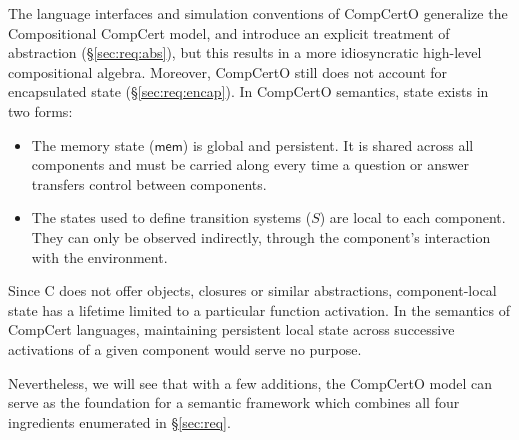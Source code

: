 \documentclass[acmsmall,screen,review,anonymous]{acmart}
\newcommand{\kw}[1]{\ensuremath{ \mathsf{#1} }}
\begin{document}
The language interfaces and simulation conventions of CompCertO
generalize the Compositional CompCert model,
and introduce an explicit treatment of abstraction (\S\ref{sec:req:abs}),
but this results in a more idiosyncratic
high-level compositional algebra.
Moreover,
CompCertO still does not account for
encapsulated state (\S\ref{sec:req:encap}).
In CompCertO semantics, state exists in two forms:
\begin{itemize}
  \item The memory state ($\kw{mem}$) is global and persistent.
    It is shared across all components
    and must be carried along
    every time a question or answer transfers control
    between components.
  \item The states used to define transition systems ($S$)
    are local to each component.
    They can only be observed indirectly,
    through the component's interaction with the environment.
\end{itemize}
Since C does not offer objects, closures or similar abstractions,
component-local state has a lifetime limited to a particular function activation.
In the semantics of CompCert languages,
maintaining persistent local state
across successive activations of a given component
would serve no purpose.

Nevertheless,
we will see that with a few additions,
the CompCertO model
can serve as the foundation
for a semantic framework
which combines all four ingredients
enumerated in \S\ref{sec:req}.


\end{document}
